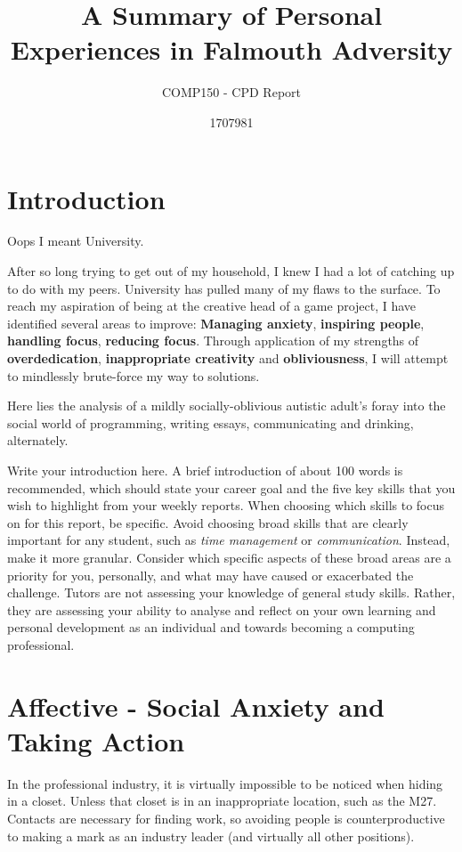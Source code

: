 \documentclass{scrartcl}
\title{A Summary of Personal Experiences in Falmouth Adversity}
\subtitle{COMP150 - CPD Report}
\author{1707981}
\begin{document}
\maketitle

\section{Introduction}
Oops I meant University.

After so long trying to get out of my household, I knew I had a lot of catching up to do with my peers. University has pulled many of my flaws to the surface. To reach my aspiration of being at the creative head of a game project, I have identified several areas to improve: \textbf{Managing anxiety}, \textbf{inspiring people}, \textbf{handling focus}, \textbf{reducing focus}. Through application of my strengths of \textbf{overdedication}, \textbf{inappropriate creativity} and \textbf{obliviousness}, I will attempt to mindlessly brute-force my way to solutions.

Here lies the analysis of a mildly socially-oblivious autistic adult's foray into the social world of programming, writing essays, communicating and drinking, alternately.

Write your introduction here. A brief introduction of about 100 words is recommended, which should state your career goal and the five key skills that you wish to highlight from your weekly reports. When choosing which skills to focus on for this report, be specific. Avoid choosing broad skills that are clearly important for any student, such as \textit{time management} or \textit{communication}. Instead, make it more granular. Consider which specific aspects of these broad areas are a priority for you, personally, and what may have caused or exacerbated the challenge. Tutors are not assessing your knowledge of general study skills. Rather, they are assessing your ability to analyse and reflect on your own learning and personal development as an individual and towards becoming a computing professional.

\section{Affective - Social Anxiety and Taking Action}
In the professional industry, it is virtually impossible to be noticed when hiding in a closet. Unless that closet is in an inappropriate location, such as the M27. Contacts are necessary for finding work, so avoiding people is counterproductive to making a mark as an industry leader (and virtually all other positions).
\end{document}
